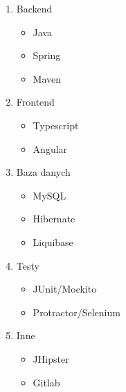 \begin{enumerate}
    \item Backend
    \begin{itemize}
        \item Java
        \item Spring
        \item Maven
    \end{itemize}

    \item Frontend
    \begin{itemize}
        \item Typescript
        \item Angular
    \end{itemize}

    \item Baza danych
    \begin{itemize}
        \item MySQL
        \item Hibernate
        \item Liquibase
    \end{itemize}

    \item Testy
    \begin{itemize}
        \item JUnit/Mockito
        \item Protractor/Selenium
    \end{itemize}

    \item Inne
    \begin{itemize}
        \item JHipster
        \item Gitlab
    \end{itemize}
\end{enumerate}
